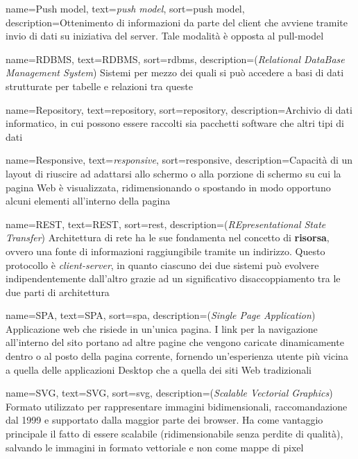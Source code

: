 {
    name={Push model},
    text=\emph{push model},
    sort=push model,
    description={Ottenimento di informazioni da parte del client che avviene
    tramite invio di dati su iniziativa del server. Tale modalità è opposta al
    \gls{pull-model}}
}

{
    name={RDBMS},
    text=RDBMS,
    sort=rdbms,
    description={(\emph{Relational DataBase Management System}) Sistemi per mezzo dei quali si può accedere a basi di dati strutturate per tabelle e relazioni tra queste}
}

{
    name={Repository},
    text=repository,
    sort=repository,
    description={Archivio di dati informatico, in cui possono essere raccolti sia pacchetti software che altri tipi di dati}
}

{
    name={Responsive},
    text=\emph{responsive},
    sort=responsive,
    description={Capacità di un layout di riuscire ad adattarsi allo schermo o alla porzione di schermo su cui la pagina Web è visualizzata, ridimensionando o spostando in modo opportuno alcuni elementi all'interno della pagina}
}

{
    name={REST},
    text=REST,
    sort=rest,
    description={(\emph{REpresentational State Transfer}) Architettura di rete ha le sue fondamenta nel concetto di \textbf{risorsa}, ovvero una fonte di informazioni raggiungibile tramite un indirizzo. Questo protocollo è \emph{client-server}, in quanto ciascuno dei due sistemi può evolvere indipendentemente dall'altro grazie ad un significativo disaccoppiamento tra le due parti di architettura}
}

{
    name={SPA},
    text=SPA,
    sort=spa,
    description={(\emph{Single Page Application}) Applicazione web che risiede in un'unica pagina. I link per la navigazione all'interno del sito portano ad altre pagine che vengono caricate dinamicamente dentro o al posto della pagina corrente, fornendo un'esperienza utente più vicina a quella delle applicazioni Desktop che a quella dei siti Web tradizionali}
}

{
    name={SVG},
    text=SVG,
    sort=svg,
    description={(\emph{Scalable Vectorial Graphics}) Formato utilizzato per rappresentare immagini bidimensionali, raccomandazione  dal 1999 e supportato dalla maggior parte dei browser. Ha come vantaggio principale il fatto di essere scalabile (ridimensionabile senza perdite di qualità), salvando le immagini in formato vettoriale e non come mappe di pixel}
}

